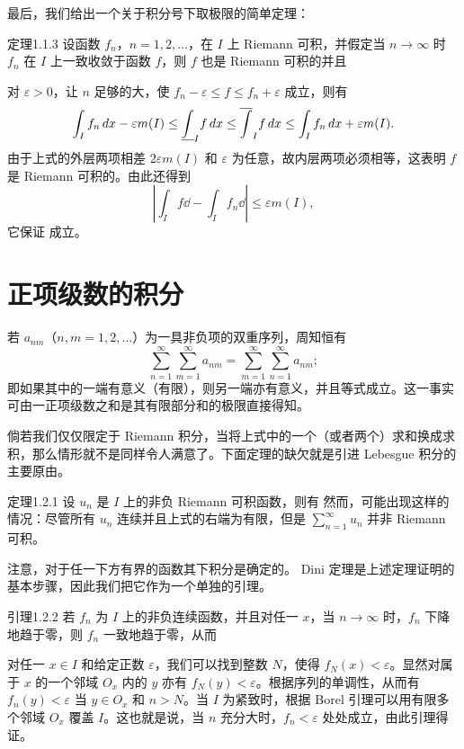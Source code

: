 最后，我们给出一个关于积分号下取极限的简单定理：
\begin{statement}{定理}{1.1.3}
设函数 $f_n$，$n=1,2,\ldots$，在 $I$ 上 Riemann 可积，并假定当 $n\to\infty$ 时 $f_n$ 在 $I$ 上一致收敛于函数 $f$，则 $f$ 也是 Riemann 可积的并且
\end{statement}
\Proof 对 $\varepsilon>0$，让 $n$ 足够的大，使
$f_n-\varepsilon\le f\le f_n+\varepsilon$ 成立，则有
\[\int_I f_n\,dx-\varepsilon m(I)\le\underline{\int}_I f\,dx\le\overline{\int}_I f\,dx\le\int_I f_n\,dx+\varepsilon m(I).\]
由于上式的外层两项相差 $2\varepsilon m(I)$ 和 $\varepsilon$ 为任意，故内层两项必须相等，这表明 $f$ 是 Riemann 可积的。由此还得到
\[\left|\int_I f\dd-\int_I f_n\dd\right|\le\varepsilon m(I),\]
它保证  成立。
\section{正项级数的积分}
若 $a_{nm}$（$n,m=1,2,\ldots$）为一具非负项的双重序列，周知恒有
\[\sum_{n=1}^\infty\sum_{m=1}^\infty a_{nm}=\sum_{m=1}^\infty\sum_{n=1}^\infty a_{nm};\]
即如果其中的一端有意义（有限），则另一端亦有意义，并且等式成立。这一事实可由一正项级数之和是其有限部分和的极限直接得知。

倘若我们仅仅限定于 Riemann 积分，当将上式中的一个（或者两个）求和换成求积，那么情形就不是同样令人满意了。下面定理的缺欠就是引进 Lebesgue 积分的主要原由。
\begin{statement}{定理}{1.2.1}
设 $u_n$ 是 $I$ 上的非负 Riemann 可积函数，则有
然而，可能出现这样的情况：尽管所有 $u_n$ 连续并且上式的右端为有限，但是 $\sum_{n=1}^\infty u_n$ 并非 Riemann 可积。
\end{statement}
注意，对于任一下方有界的函数其下积分是确定的。
Dini 定理是上述定理证明的基本步骤，因此我们把它作为一个单独的引理。
\begin{statement}{引理}{1.2.2}
若 $f_n$ 为 $I$ 上的非负连续函数，并且对任一 $x$，当 $n\to\infty$ 时，$f_n$ 下降地趋于零，则 $f_n$ 一致地趋于零，从而
\end{statement}
\Proof 对任一 $x\in I$ 和给定正数 $\varepsilon$，我们可以找到整数 $N$，使得 $f_N(x)<\varepsilon$。显然对属于 $x$ 的一个邻域 $O_x$ 内的 $y$ 亦有 $f_N(y)<\varepsilon$。根据序列的单调性，从而有 $f_n(y)<\varepsilon$ 当 $y\in O_x$ 和 $n>N$。当 $I$ 为紧致时，根据 Borel 引理可以用有限多个邻域 $O_x$ 覆盖 $I$。这也就是说，当 $n$ 充分大时，$f_n<\varepsilon$ 处处成立，由此引理得证。


